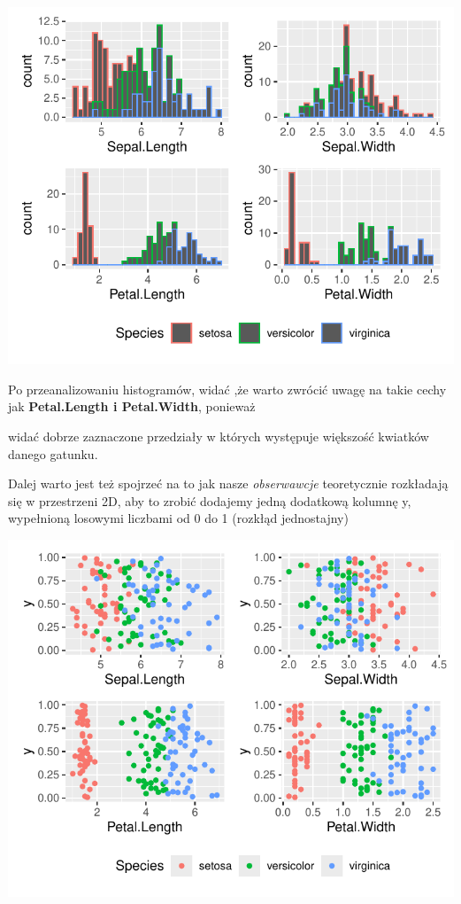\documentclass[
  12pt,
]{article}
\begin{document}
\begin{center}\includegraphics{Sprawozdanie2_files/figure-latex/zad1b-1} \end{center}

Po przeanalizowaniu histogramów, widać ,że warto zwrócić uwagę na takie
cechy jak \textbf{Petal.Length i Petal.Width}, ponieważ

widać dobrze zaznaczone przedziały w których występuje większość
kwiatków danego gatunku.

Dalej warto jest też spojrzeć na to jak nasze \emph{obserwawcje}
teoretycznie rozkładają się w przestrzeni 2D, aby to zrobić dodajemy
jedną dodatkową kolumnę y, wypełnioną losowymi liczbami od 0 do 1
(rozkłąd jednostajny)

\begin{center}\includegraphics{Sprawozdanie2_files/figure-latex/zad1b1-1} \end{center}
\end{document}
